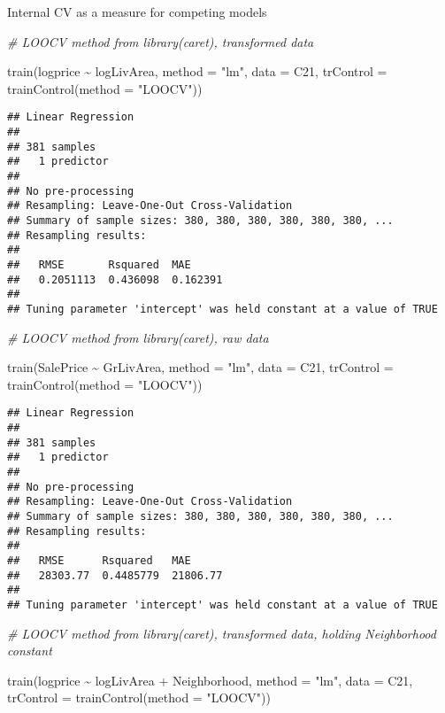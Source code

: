 \documentclass[
]{article}
\newenvironment{Shaded}{\begin{snugshade}}{\end{snugshade}}
\newcommand{\AttributeTok}[1]{\textcolor[rgb]{0.77,0.63,0.00}{#1}}
\newcommand{\CommentTok}[1]{\textcolor[rgb]{0.56,0.35,0.01}{\textit{#1}}}
\newcommand{\FunctionTok}[1]{\textcolor[rgb]{0.00,0.00,0.00}{#1}}
\newcommand{\NormalTok}[1]{#1}
\newcommand{\SpecialCharTok}[1]{\textcolor[rgb]{0.00,0.00,0.00}{#1}}
\newcommand{\StringTok}[1]{\textcolor[rgb]{0.31,0.60,0.02}{#1}}
\begin{document}
Internal CV as a measure for competing models

\begin{Shaded}
\begin{Highlighting}[]
\CommentTok{\# LOOCV method from library(caret), transformed data}

\FunctionTok{train}\NormalTok{(logprice }\SpecialCharTok{\textasciitilde{}}\NormalTok{ logLivArea, }\AttributeTok{method =} \StringTok{"lm"}\NormalTok{, }\AttributeTok{data =}\NormalTok{ C21, }\AttributeTok{trControl =} \FunctionTok{trainControl}\NormalTok{(}\AttributeTok{method =} \StringTok{"LOOCV"}\NormalTok{))}
\end{Highlighting}
\end{Shaded}

\begin{verbatim}
## Linear Regression 
## 
## 381 samples
##   1 predictor
## 
## No pre-processing
## Resampling: Leave-One-Out Cross-Validation 
## Summary of sample sizes: 380, 380, 380, 380, 380, 380, ... 
## Resampling results:
## 
##   RMSE       Rsquared  MAE     
##   0.2051113  0.436098  0.162391
## 
## Tuning parameter 'intercept' was held constant at a value of TRUE
\end{verbatim}

\begin{Shaded}
\begin{Highlighting}[]
\CommentTok{\# LOOCV method from library(caret), raw data}

\FunctionTok{train}\NormalTok{(SalePrice }\SpecialCharTok{\textasciitilde{}}\NormalTok{ GrLivArea, }\AttributeTok{method =} \StringTok{"lm"}\NormalTok{, }\AttributeTok{data =}\NormalTok{ C21, }\AttributeTok{trControl =} \FunctionTok{trainControl}\NormalTok{(}\AttributeTok{method =} \StringTok{"LOOCV"}\NormalTok{))}
\end{Highlighting}
\end{Shaded}

\begin{verbatim}
## Linear Regression 
## 
## 381 samples
##   1 predictor
## 
## No pre-processing
## Resampling: Leave-One-Out Cross-Validation 
## Summary of sample sizes: 380, 380, 380, 380, 380, 380, ... 
## Resampling results:
## 
##   RMSE      Rsquared   MAE     
##   28303.77  0.4485779  21806.77
## 
## Tuning parameter 'intercept' was held constant at a value of TRUE
\end{verbatim}

\begin{Shaded}
\begin{Highlighting}[]
\CommentTok{\# LOOCV method from library(caret), transformed data, holding Neighborhood constant}

\FunctionTok{train}\NormalTok{(logprice }\SpecialCharTok{\textasciitilde{}}\NormalTok{ logLivArea }\SpecialCharTok{+}\NormalTok{ Neighborhood, }\AttributeTok{method =} \StringTok{"lm"}\NormalTok{, }\AttributeTok{data =}\NormalTok{ C21, }\AttributeTok{trControl =} \FunctionTok{trainControl}\NormalTok{(}\AttributeTok{method =} \StringTok{"LOOCV"}\NormalTok{))}
\end{Highlighting}
\end{Shaded}
\end{document}
